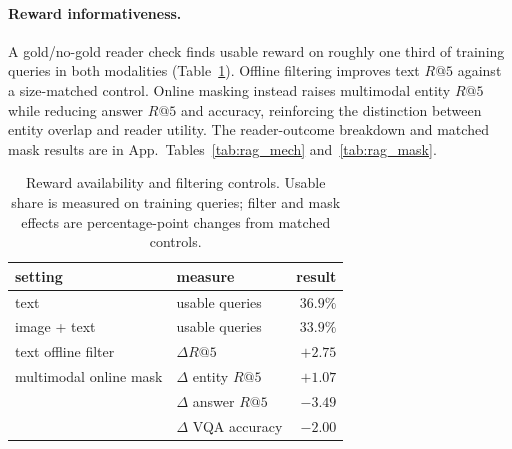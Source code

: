 \paragraph{Reward informativeness.} A gold/no-gold reader check finds usable reward on roughly one
third of training queries in both modalities (Table~\ref{tab:ab_reward}). Offline filtering improves
text $R@5$ against a size-matched control. Online masking instead raises multimodal entity $R@5$
while reducing answer $R@5$ and accuracy, reinforcing the distinction between entity overlap and
reader utility. The reader-outcome breakdown and matched mask results are in
App.~Tables~\ref{tab:rag_mech} and~\ref{tab:rag_mask}.

\begin{table}[H]
\centering\small
\caption{Reward availability and filtering controls. Usable share is measured on training queries;
filter and mask effects are percentage-point changes from matched controls.}
\label{tab:ab_reward}
\begin{tabular}{llr}
\toprule
setting & measure & result \\
\midrule
text & usable queries & $36.9\%$ \\
image + text & usable queries & $33.9\%$ \\
text offline filter & $\Delta R@5$ & $+2.75$ \\
multimodal online mask & $\Delta$ entity $R@5$ & $+1.07$ \\
 & $\Delta$ answer $R@5$ & $-3.49$ \\
 & $\Delta$ VQA accuracy & $-2.00$ \\
\bottomrule
\end{tabular}
\end{table}
